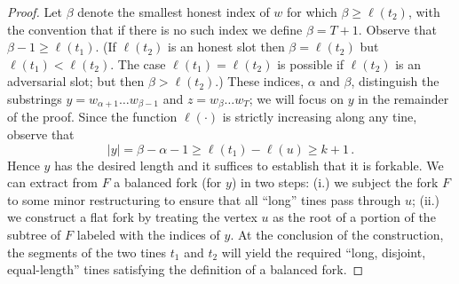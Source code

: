 \begin{proof}
    

    

    Let $\beta$ denote the smallest honest index of $w$ for which
    $\beta \geq \ell(t_2)$, with the convention that if there is no such
    index we define $\beta = T + 1$. 
    Observe that $\beta - 1 \geq \ell(t_1)$. 
    (If $\ell(t_2)$ is an honest slot then $\beta = \ell(t_2)$ 
    but $\ell(t_1) < \ell(t_2)$. 
    The case $\ell(t_1) = \ell(t_2)$ is possible if $\ell(t_2)$ is an adversarial slot; 
    but then $\beta > \ell(t_2)$.)
    These indices, $\alpha$ and $\beta$, distinguish the
    substrings $y = w_{\alpha+1} \ldots w_{\beta-1}$ and 
    $z = w_{\beta} \ldots w_T$; 
    we will focus on $y$ in the remainder of the proof. 
    Since the function
    $\ell(\cdot)$ is strictly increasing along any tine, observe that
    \begin{equation*}
        |y| 
        = \beta - \alpha - 1 
        \geq \ell(t_1) - \ell(u) 
        \geq k + 1
        \,.
    \end{equation*}
    Hence $y$ has the desired length and it suffices to establish that it is forkable.
    We can extract from $F$ a balanced fork (for $y$) in
    two steps: (i.) we subject the fork $F$ to some minor
    restructuring to ensure that all ``long'' tines pass through $u$;
    (ii.) we construct a flat fork by treating the vertex $u$ as the
    root of a portion of the subtree of $F$ labeled with the indices of
    $y$. At the conclusion of the construction, the segments of the
    two tines $t_1$ and $t_2$ will yield the required ``long, disjoint, equal-length''
    tines satisfying the definition of a balanced fork.


\end{proof}
